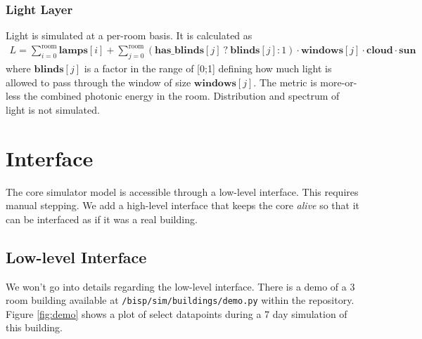 \documentclass[10pt]{article}
\begin{document}
\subsubsection{Light Layer}

Light is simulated at a per-room basis. It is calculated as
\begin{eqnarray}
  \nonumber L =
            \sum\limits_{i=0}^{\mathrm{room}} \mathbf{lamps}[i] +
            \sum\limits_{j=0}^{\mathrm{room}}
            \left(
              \mathbf{has\_blinds}[j] ~?~ \mathbf{blinds}[j] : 1
            \right) \cdot \mathbf{windows}[j] \cdot \mathbf{cloud} \cdot \mathbf{sun}
\end{eqnarray}
where $\mathbf{blinds}[j]$ is a factor in the range of [0;1] defining how much light is allowed to pass through the window of size $\mathbf{windows}[j]$. The metric is more-or-less the combined photonic energy in the room. Distribution and spectrum of light is not simulated.


\section{Interface}
\label{sec:interface}

The core simulator model is accessible through a low-level interface. This requires manual stepping. We add a high-level interface that keeps the core \textsl{alive} so that it can be interfaced as if it was a real building.

\subsection{Low-level Interface}

We won't go into details regarding the low-level interface. There is a demo of a 3 room building available at \texttt{/bisp/sim/buildings/demo.py} within the repository. Figure \ref{fig:demo} shows a plot of select datapoints during a 7 day simulation of this building.
\end{document}
